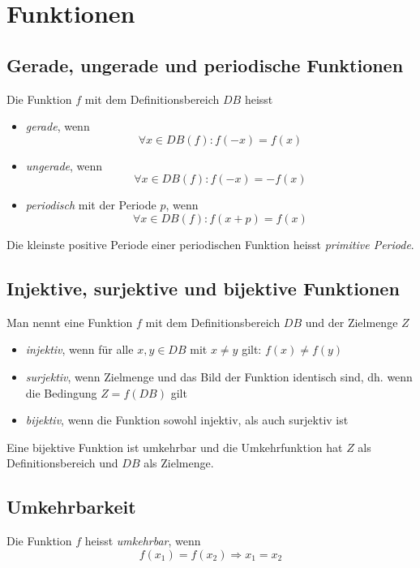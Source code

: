 \section{Funktionen}

\subsection{Gerade, ungerade und periodische Funktionen}

Die Funktion $f$ mit dem Definitionsbereich $DB$ heisst

\begin{itemize}
	\item \textit{gerade}, wenn \[\forall x \in DB(f): f(-x) = f(x)\]
	\item \textit{ungerade}, wenn \[\forall x \in DB(f): f(-x) = -f(x)\]
	\item \textit{periodisch} mit der Periode $p$, wenn \[\forall x \in DB(f): f(x + p) = f(x)\]
\end{itemize}

Die kleinste positive Periode einer periodischen Funktion heisst \textit{primitive Periode}.

\subsection{Injektive, surjektive und bijektive Funktionen}

Man nennt eine Funktion $f$ mit dem Definitionsbereich $DB$ und der Zielmenge $Z$

\begin{itemize}
	\item \textit{injektiv}, wenn für alle $x,y \in DB$ mit $x \neq y$ gilt: $f(x) \neq f(y)$
	\item \textit{surjektiv}, wenn  Zielmenge und das Bild der Funktion identisch sind, dh. wenn die
		Bedingung $Z = f(DB)$ gilt
	\item \textit{bijektiv}, wenn die Funktion sowohl injektiv, als auch surjektiv ist
\end{itemize}

Eine bijektive Funktion ist umkehrbar und die Umkehrfunktion hat $Z$ als Definitionsbereich und
$DB$ als Zielmenge.

\subsection{Umkehrbarkeit}

Die Funktion $f$ heisst \textit{umkehrbar}, wenn
%
\begin{displaymath}
	f(x_1) = f(x_2) \Rightarrow x_1 = x_2
\end{displaymath}

